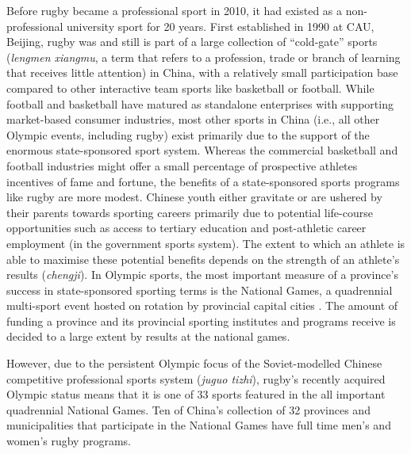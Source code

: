 Before rugby became a professional sport in 2010, it had existed as a non-professional university sport for 20 years.  First established in 1990 at CAU, Beijing, rugby was and still is part of a large collection of ``cold-gate'' sports (\textit{lengmen xiangmu}, a term that refers to a profession, trade or branch of learning that receives little attention) in China, with a relatively small participation base compared to other interactive team sports like basketball or football.  While football and basketball have matured as standalone enterprises with supporting market-based consumer industries, most other sports in China (i.e., all other Olympic events, including rugby) exist primarily due to the support of the enormous state-sponsored sport system.  Whereas the commercial basketball and football industries might offer a small percentage of prospective athletes incentives of fame and fortune, the benefits of a state-sponsored sports programs like rugby are more modest.  Chinese youth either gravitate or are ushered by their parents towards sporting careers primarily due to potential life-course opportunities such as access to tertiary education and post-athletic career employment (in the government sports system).  The extent to which an athlete is able to maximise these potential benefits depends on the strength of an athlete's results (\textit{chengji}).
In Olympic sports, the most important measure of a province's success in state-sponsored sporting terms is the National Games, a quadrennial multi-sport event hosted on rotation by provincial capital cities \citep{Hong2002}.  The amount of funding a province and its provincial sporting institutes and programs receive is decided to a large extent by results at the national games.


However, due to the persistent Olympic focus of the Soviet-modelled Chinese competitive professional sports system (\textit{juguo tizhi}), rugby's recently acquired Olympic status means that it is one of 33 sports featured in the all important quadrennial National Games.  Ten of China's collection of 32 provinces and municipalities that participate in the National Games have full time men's and women's rugby programs.



